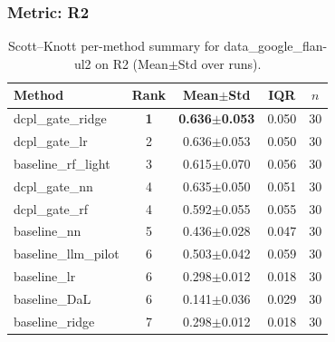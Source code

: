 \subsubsection*{Metric: R2}
\begin{table}[H]
\centering
\scriptsize
\setlength{\tabcolsep}{4pt}
\renewcommand{\arraystretch}{1.1}
\caption{Scott--Knott per-method summary for data\_google\_flan-ul2 on R2 (Mean$\pm$Std over runs).}
\label{tab:sk_data_google_flan-ul2_R2}
\begin{tabular}{l|c|c|c|c}
\hline
\textbf{Method} & \textbf{Rank} & \textbf{Mean$\pm$Std} & \textbf{IQR} & \textbf{$n$} \\
\hline
\rowcolor{red!15} dcpl\_gate\_ridge & \textbf{1} & \textbf{0.636$\pm$0.053} & 0.050 & 30 \\
dcpl\_gate\_lr & 2 & 0.636$\pm$0.053 & 0.050 & 30 \\
baseline\_rf\_light & 3 & 0.615$\pm$0.070 & 0.056 & 30 \\
dcpl\_gate\_nn & 4 & 0.635$\pm$0.050 & 0.051 & 30 \\
dcpl\_gate\_rf & 4 & 0.592$\pm$0.055 & 0.055 & 30 \\
baseline\_nn & 5 & 0.436$\pm$0.028 & 0.047 & 30 \\
baseline\_llm\_pilot & 6 & 0.503$\pm$0.042 & 0.059 & 30 \\
baseline\_lr & 6 & 0.298$\pm$0.012 & 0.018 & 30 \\
baseline\_DaL & 6 & 0.141$\pm$0.036 & 0.029 & 30 \\
baseline\_ridge & 7 & 0.298$\pm$0.012 & 0.018 & 30 \\
\hline
\end{tabular}
\end{table}

